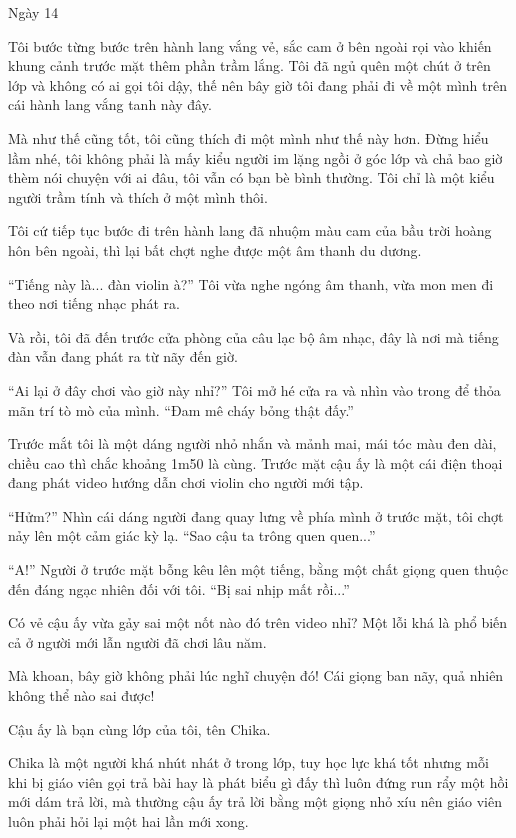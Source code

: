 {Ngày 14}
{
Tôi bước từng bước trên hành lang vắng vẻ, sắc cam ở bên ngoài rọi vào
khiến khung cảnh trước mặt thêm phần trầm lắng. Tôi đã ngủ quên một chút
ở trên lớp và không có ai gọi tôi dậy, thế nên bây giờ tôi đang phải đi
về một mình trên cái hành lang vắng tanh này đây.

Mà như thế cũng tốt, tôi cũng thích đi một mình như thế này hơn. Đừng
hiểu lầm nhé, tôi không phải là mấy kiểu người im lặng ngồi ở góc lớp và
chả bao giờ thèm nói chuyện với ai đâu, tôi vẫn có bạn bè bình thường.
Tôi chỉ là một kiểu người trầm tính và thích ở một mình thôi.

Tôi cứ tiếp tục bước đi trên hành lang đã nhuộm màu cam của bầu trời
hoàng hôn bên ngoài, thì lại bất chợt nghe được một âm thanh du dương.

``Tiếng này là... đàn violin à?'' Tôi vừa nghe ngóng âm thanh, vừa mon
men đi theo nơi tiếng nhạc phát ra.

Và rồi, tôi đã đến trước cửa phòng của câu lạc bộ âm nhạc, đây là nơi mà
tiếng đàn vẫn đang phát ra từ nãy đến giờ.

``Ai lại ở đây chơi vào giờ này nhỉ?'' Tôi mở hé cửa ra và nhìn vào
trong để thỏa mãn trí tò mò của mình. ``Đam mê cháy bỏng thật đấy.''

Trước mắt tôi là một dáng người nhỏ nhắn và mảnh mai, mái tóc màu đen
dài, chiều cao thì chắc khoảng 1m50 là cùng. Trước mặt cậu ấy là một cái
điện thoại đang phát video hướng dẫn chơi violin cho người mới tập.

``Hửm?'' Nhìn cái dáng người đang quay lưng về phía mình ở trước mặt,
tôi chợt nảy lên một cảm giác kỳ lạ. ``Sao cậu ta trông quen quen...''

``A!'' Người ở trước mặt bỗng kêu lên một tiếng, bằng một chất giọng
quen thuộc đến đáng ngạc nhiên đối với tôi. ``Bị sai nhịp mất rồi...''

Có vẻ cậu ấy vừa gảy sai một nốt nào đó trên video nhỉ? Một lỗi khá là
phổ biến cả ở người mới lẫn người đã chơi lâu năm.

Mà khoan, bây giờ không phải lúc nghĩ chuyện đó! Cái giọng ban nãy, quả
nhiên không thể nào sai được!

Cậu ấy là bạn cùng lớp của tôi, tên Chika.

Chika là một người khá nhút nhát ở trong lớp, tuy học lực khá tốt nhưng
mỗi khi bị giáo viên gọi trả bài hay là phát biểu gì đấy thì luôn đứng
run rẩy một hồi mới dám trả lời, mà thường cậu ấy trả lời bằng một giọng
nhỏ xíu nên giáo viên luôn phải hỏi lại một hai lần mới xong.

}
